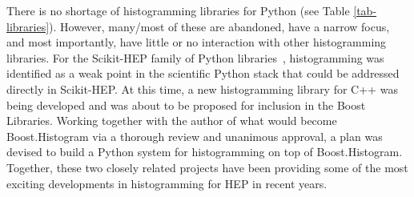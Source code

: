 \documentclass{webofc}
\begin{document}
There is no shortage of histogramming libraries for Python (see Table \ref{tab-libraries}). However, many/most of these are abandoned, have a narrow focus, and most importantly, have little or no interaction with other histogramming libraries. For the Scikit-HEP family of Python libraries~\cite{Eduardo:2019chep}, histogramming was identified as a weak point in the scientific Python stack that could be addressed directly in Scikit-HEP. At this time, a new histogramming library for C++ was being developed and was about to be proposed for inclusion in the Boost Libraries. Working together with the author of what would become Boost.Histogram via a thorough review and unanimous approval, a plan was devised to build a Python system for histogramming on top of Boost.Histogram. Together, these two closely related projects have been providing some of the most exciting developments in histogramming for HEP in recent years.
\end{document}
